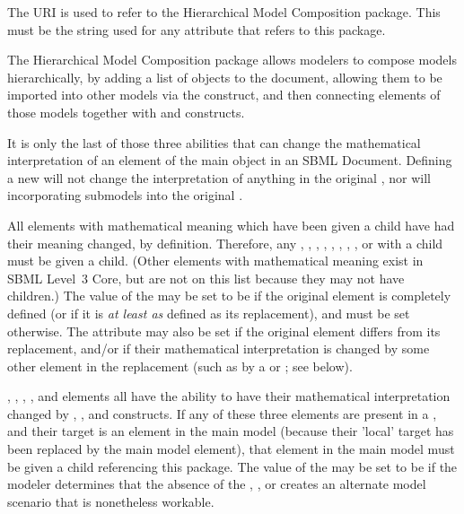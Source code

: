 The URI  is used to refer to the Hierarchical Model Composition package.  This must be the string used for any  attribute that refers to this package.

The Hierarchical Model Composition package allows modelers to compose models hierarchically, by adding a list of \Model objects to the document, allowing them to be imported into other models via the \Submodel construct, and then connecting elements of those models together with \ReplacedElement and \ReplacedBy constructs.

It is only the last of those three abilities that can change the mathematical interpretation of an element of the main \Model object in an SBML Document.  Defining a new \Model will not change the interpretation of anything in the original \Model, nor will incorporating submodels into the original \Model.

All elements with mathematical meaning which have been given a \ReplacedBy child have had their meaning changed, by definition.  Therefore, any \Compartment, \Parameter, \Reaction, \Species, \Constraint, \Event, \FunctionDefinition, \InitialAssignment, or \Rule with a \ReplacedBy child must be given a \MathChanged child.  (Other elements with mathematical meaning exist in SBML Level~3 Core, but are not on this list because they may not have \ReplacedBy children.)  The value of the  may be set to be  if the original element is completely defined (or if it is \emph{at least as} defined as its replacement), and must be set  otherwise.  The attribute may also be set  if the original element differs from its replacement, and/or if their mathematical interpretation is changed by some other element in the replacement (such as by a \Rule or \Reaction; see below).

\Compartment, \Parameter, \Reaction, \Species, and \SpeciesReference elements all have the ability to have their mathematical interpretation changed by \InitialAssignment, \Rule, and \Event constructs.  If any of these three elements are present in a \Submodel, and their target is an element in the main model (because their 'local' target has been replaced by the main model element), that element in the main model must be given a \MathChanged child referencing this package.  The value of the  may be set to be  if the modeler determines that the absence of the \InitialAssignment, \Rule, or \Event creates an alternate model scenario that is nonetheless workable.


